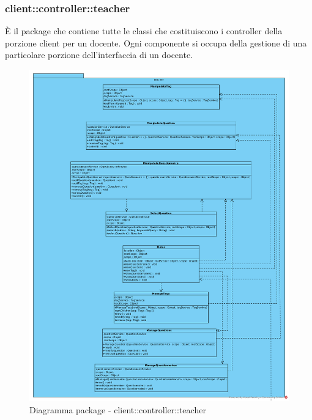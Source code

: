 \subsubsection{client::controller::teacher}
È il package che contiene tutte le classi che costituiscono i controller della porzione client per un docente. Ogni componente si occupa della gestione di una particolare porzione dell'interfaccia di un docente.\begin{center}
		\begin{figure}[H]
			\centering \includegraphics[scale=4, max width=\textwidth, max height=\myheight]{../img/diagrammiClassi/client/controller/teacher.png}
			\caption{Diagramma package - client::controller::teacher}
		\end{figure}
	\end{center}\hypertarget{client::controller::teacher::ManipulateTag}{}
